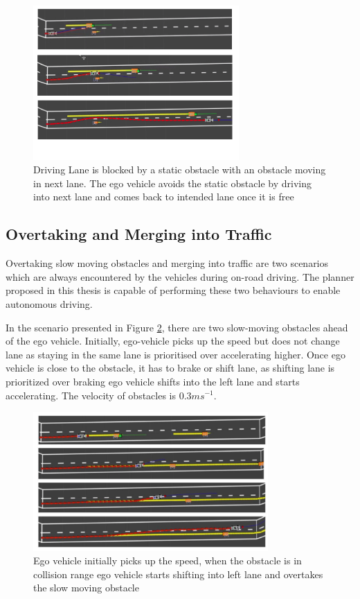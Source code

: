 \begin{figure}[h]
    \centering
    \includegraphics[width=0.7\textwidth]{Images/evaluation/2_lane_blocked.jpg}
    \caption{Driving Lane is blocked by a static obstacle with an obstacle moving in next lane. The ego vehicle avoids the static obstacle by driving into next lane and comes back to intended lane once it is free}
    \label{lane_blocked_1}
\end{figure}

\subsection{Overtaking and Merging into Traffic}

Overtaking slow moving obstacles and merging into traffic are two scenarios which are always encountered by the vehicles during on-road driving. The planner proposed in this thesis is capable of performing these two behaviours to enable autonomous driving. 

In the scenario presented in Figure \ref{slow_moving_1}, there are two slow-moving obstacles ahead of the ego vehicle. Initially, ego-vehicle picks up the speed but does not change lane as staying in the same lane is prioritised over accelerating higher. Once ego vehicle is close to the obstacle, it has to brake or shift lane, as shifting lane is prioritized over braking ego vehicle shifts into the left lane and starts accelerating. The velocity of obstacles is $0.3ms^{-1}$. 

\begin{figure}
	\centering
	\includegraphics[width=0.8\textwidth]{Images/evaluation/overtake_1.jpg}
	\caption{Ego vehicle initially picks up the speed, when the obstacle is in collision range ego vehicle starts shifting into left lane and overtakes the slow moving obstacle}
	\label{slow_moving_1}
\end{figure}


